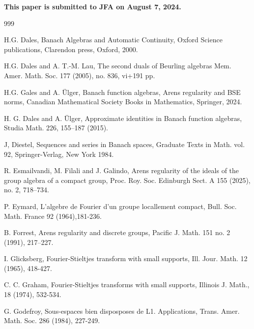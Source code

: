 \documentclass[12pt, twoside, leqno]{article}
\theoremstyle{definition}
\theoremstyle{definition}
\numberwithin{equation}{section}
\begin{document}
\textbf{This paper is submitted to JFA on August 7, 2024.} \vspace{3mm}


\begin{thebibliography}{999}


 H.G. Dales, Banach Algebras and Automatic Continuity, Oxford Science publications, Clarendon press, Oxford, 2000.\vspace{2mm}

 H.G. Dales and A. T.-M. Lau, The second duals of Beurling algebras Mem. Amer. Math. Soc. 177 (2005), no. 836, vi+191 pp.

  H.G. Gales and A. Ülger, Banach function algebras, Arens regularity and BSE norms, Canadian Mathematical Society Books in Mathematics, Springer, 2024.\vspace{2mm}
 
  H. G. Dales and A. Ülger, Approximate identities in Banach function algebras, Studia Math. 226, 155–187 (2015).\vspace{2mm}
 
 J, Diestel, Sequences and series in Banach spaces, Graduate Texts in Math. vol. 92, Springer-Verlag, New York 1984.\vspace{2mm}

 R. Esmailvandi, M. Filali and J. Galindo, Arens regularity of the ideals of  the group algebra of a compact group, Proc. Roy. Soc. Edinburgh Sect. A 155 (2025), no. 2, 718–734. \vspace{2mm}

  P. Eymard, L'algebre de Fourier d'un groupe locallement compact, Bull. Soc. Math. France 92 (1964),181-236.\vspace{2mm}

  B. Forrest, Arens regularity and discrete groups, Pacific J. Math. 151 no. 2 (1991), 217–227.\vspace{2mm}

  I. Glicksberg, Fourier-Stieltjes transform with small supports, Ill. Jour. Math. 12 (1965), 418-427.\vspace{2mm}

  C. C. Graham, Fourier-Stieltjes transforms with small supports, Illinois J. Math., 18 (1974), 532-534.\vspace{2mm}

  G. Godefroy, Sous-espaces bien disposposes de L1. Applications, Trans. Amer. Math. Soc. 286 (1984), 227-249.\vspace{2mm}


\end{thebibliography}
\end{document}
